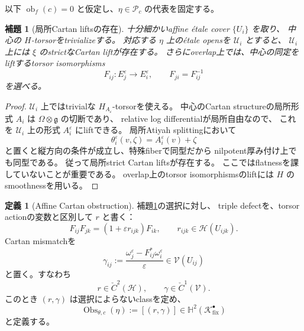 \documentclass[uplatex,dvipdfmx,11pt]{jsarticle}
\numberwithin{equation}{section}
\theoremstyle{plain}
\newtheorem{lemma}[theorem]{補題}
\theoremstyle{definition}
\newtheorem{definition}[theorem]{定義}
\theoremstyle{remark}
\DeclareMathOperator{\Obs}{Obs}
\DeclareMathOperator{\obf}{ob}
\newcommand{\g}{\mathfrak g}
\newcommand{\shH}{\mathcal H}
\newcommand{\shV}{\mathcal V}
\newcommand{\Kfix}{\mathcal K_{\mathrm{fix}}^\bullet}
\newcommand{\Aeps}{A_\varepsilon}
\newcommand{\Hyp}{\mathbb H}
\begin{document}
以下 \(\obf_f(c)=0\) と仮定し、\(\eta\in\mathcal P_c\) の代表を固定する。

\begin{lemma}[局所Cartan liftsの存在]
\label{lem:local-cartan-lift}
十分細かいaffine étale cover \(\{U_i\}\) を取り、
中心の \(H\)-torsorをtrivializeする。
対応する \(\eta\) 上のétale opensを \(\mathcal U_i\) とすると、
\(\mathcal U_i\) 上には \(\xi\) のstrictなCartan liftが存在する。
さらにoverlap上では、中心の同定をliftするtorsor isomorphisms
\[
F_{ij}:E_j^\varepsilon\longrightarrow E_i^\varepsilon,
\qquad F_{ji}=F_{ij}^{-1}
\]
を選べる。
\end{lemma}

\begin{proof}
\(\mathcal U_i\) 上ではtrivialな \(H_{\Aeps}\)-torsorを使える。
中心のCartan structureの局所形式 \(A_i\) は \(\Omega\otimes\g\) の切断であり、
relative log differentialが局所自由なので、
これを \(\mathcal U_i\) 上の形式 \(A_i^\varepsilon\) にliftできる。
局所Atiyah splittingにおいて
\[
\theta_i^\varepsilon(v,\zeta)=A_i^\varepsilon(v)+\zeta
\]
と置くと縦方向の条件が成立し、特殊fiberで同型だから
nilpotent厚み付け上でも同型である。
従って局所strict Cartan liftsが存在する。
ここではflatnessを課していないことが重要である。
overlap上のtorsor isomorphismsのliftには \(H\) のsmoothnessを用いる。
\end{proof}

\begin{definition}[Affine Cartan obstruction]
\label{def:affine-obstruction}
補題\ref{lem:local-cartan-lift}の選択に対し、
triple defectを、torsor actionの変数と区別して \(r\) と書く：
\begin{equation}
\label{eq:triple-defect-r}
F_{ij}F_{jk}=(1+\varepsilon r_{ijk})F_{ik},
\qquad r_{ijk}\in\shH(U_{ijk}).
\end{equation}
Cartan mismatchを
\begin{equation}
\label{eq:gamma}
\gamma_{ij}:=
\frac{\omega_j^\varepsilon-F_{ij}^*\omega_i^\varepsilon}{\varepsilon}
\in\shV(U_{ij})
\end{equation}
と置く。すなわち
\[
r\in\check C^2(\shH),\qquad \gamma\in\check C^1(\shV).
\]
このとき \((r,\gamma)\) は選択によらないclassを定め、
\begin{equation}
\label{eq:Obs-def}
\Obs_{\theta,c}(\eta):=[(r,\gamma)]\in\Hyp^2(\Kfix)
\end{equation}
と定義する。
\end{definition}
\end{document}
